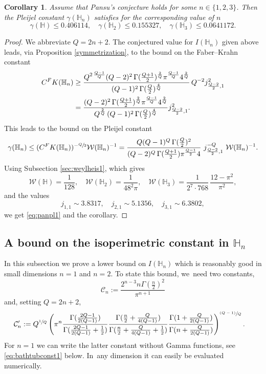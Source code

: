 \documentclass[11pt]{article}
\let\oldsfrac\sfrac
\renewcommand{\sfrac}[2]{{\oldsfrac{#1}{#2}}}
\newcommand{\psfrac}[2]{{\sfrac{(#1)}{#2}}}
\newcommand{\FK}{\textup{FK}}
\newtheorem{corollary}[theorem]{Corollary}
\theoremstyle{definition}
\newcommand{\1}{\mathbbm{1}}
\numberwithin{equation}{section}
\begin{document}
\begin{corollary}\label{pansupleijelk0}
Assume that Pansu's conjecture holds for some $n\in\{1,2,3\}$. Then the Pleijel constant $\gamma(\mathbb H_n)$ satisfies for the corresponding value of $n$
\begin{equation}\label{eq:panpl1}
\gamma(\mathbb H) \leq 0.406114,
\quad
\gamma(\mathbb H_2) \leq 0.155327,
\quad
\gamma(\mathbb H_3) \leq 0.0641172.
\end{equation}
\end{corollary}

\begin{proof}
We abbreviate $Q=2n+2$. The conjectured value for $I(\mathbb H_n)$ given above leads, via Proposition \ref{symmetrization}, to the bound on the Faber--Krahn constant
\begin{align*}
C^\FK(\mathbb H_n)
& \geq \frac{Q^{2\,\frac{Q-1}{Q}}(Q-2)^2 \,\Gamma(\tfrac{Q+1}{2})^{\frac 2Q} \pi^\frac{Q-1}{Q} 4^{\frac 2Q}}{(Q-1)^2\,\Gamma(\frac Q2)^\frac 4Q}\,
Q^{-2} j_{\frac{Q-2}{2},1}^2 \\
& =
\frac{(Q-2)^2 \,\Gamma(\tfrac{Q+1}{2})^{\frac 2Q} \pi^\frac{Q-1}{Q} 4^{\frac 2Q}}{Q^{\frac 2Q}\,(Q-1)^2\,\Gamma(\frac Q2)^\frac 4Q} j_{\frac{Q-2}{2},1}^2.
\end{align*}
This leads to the bound on the Pleijel constant
\[
\gamma(\mathbb H_n) \leq (C^\FK(\mathbb H_n))^{-\sfrac Q2} \mathcal W(\mathbb H_n)^{-1}
= \frac{Q (Q-1)^Q\,\Gamma(\frac Q2)^2} {(Q-2)^Q \,\Gamma(\tfrac{Q+1}{2}) \pi^{\frac{Q-1}2} 4} \ j_{\frac{Q-2}{2},1}^{-Q} \ \mathcal W(\mathbb H_n)^{-1}.
\]
Using Subsection \ref{sec:weylheis1}, which gives
\[
\mathcal W(\mathbb H) = \frac1{128},\quad
\mathcal W(\mathbb H_2) = \frac{1}{48^2\pi},\quad
\mathcal W(\mathbb H_3) = \frac{1}{2^7 \cdot 768}\,\frac{12 - \pi^2}{\pi^2},
\]
and the values \cite[Table 9.5]{AbSt}
\[
j_{1,1}\sim 3.8317,\quad
j_{2,1}\sim 5.1356,\quad
j_{3,1}\sim 6.3802,
\]
we get \eqref{eq:panpl1} and the corollary.
\end{proof}

\subsection{A bound on the isoperimetric constant in $\mathbb H_n$}
In this subsection we prove a lower bound on $I(\mathbb H_n)$ which is reasonably good in small dimensions $n=1$ and $n=2$. To state this bound, we~need two constants,
\begin{equation}\label{eq:sobrepconst}
\mathcal C_n := \frac{2^{n-3} n\Gamma(\frac n2)^2}{\pi^{n+1}}
\end{equation}
and, setting $Q=2n+2$,
\begin{align}\label{eq:bathtubconst}
\mathcal C_n' & := Q^\sfrac1Q \left(\pi^n \frac{\Gamma(\frac{2Q-1}{2(Q-1)})}{\Gamma(\frac{2Q-1}{2(Q-1)}+\frac12)} \frac{\Gamma(\frac n2+\frac{Q}{4(Q-1)})}{\Gamma(\frac n2+\frac{Q}{4(Q-1)}+\frac12)}
\frac{\Gamma(1+\frac{Q}{2(Q-1)})}{\Gamma(n+\frac{Q}{2(Q-1)})}\right)^\psfrac{Q-1}{Q}.
\end{align}
For $n=1$ we can write the latter constant without Gamma functions, see \eqref{eq:bathtubconst1} below. In~any dimension it can easily be evaluated numerically.
\end{document}
